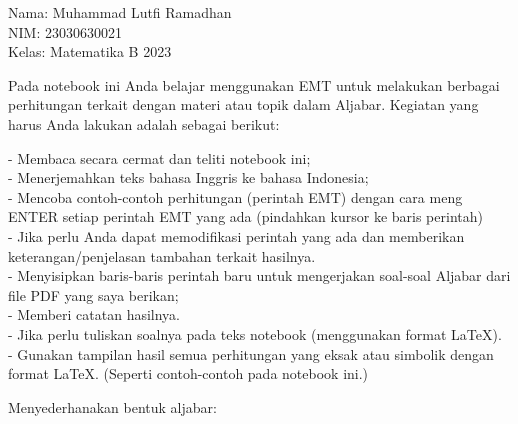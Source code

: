 \documentclass[a4paper,10pt]{article}
\begin{document}
\begin{eulernotebook}
\begin{eulercomment}
Nama: Muhammad Lutfi Ramadhan\\
NIM: 23030630021\\
Kelas: Matematika B 2023

\begin{eulercomment}
\begin{eulercomment}
Pada notebook ini Anda belajar menggunakan EMT untuk melakukan
berbagai perhitungan terkait dengan materi atau topik dalam Aljabar.
Kegiatan yang harus Anda lakukan adalah sebagai berikut:

- Membaca secara cermat dan teliti notebook ini;\\
- Menerjemahkan teks bahasa Inggris ke bahasa Indonesia;\\
- Mencoba contoh-contoh perhitungan (perintah EMT) dengan cara meng
ENTER setiap perintah EMT yang ada (pindahkan kursor ke baris
perintah)\\
- Jika perlu Anda dapat memodifikasi perintah yang ada dan memberikan
keterangan/penjelasan tambahan terkait hasilnya.\\
- Menyisipkan baris-baris perintah baru untuk mengerjakan soal-soal
Aljabar dari file PDF yang saya berikan;\\
- Memberi catatan hasilnya.\\
- Jika perlu tuliskan soalnya pada teks notebook (menggunakan format
LaTeX).\\
- Gunakan tampilan hasil semua perhitungan yang eksak atau simbolik
dengan format LaTeX. (Seperti contoh-contoh pada notebook ini.)

\end{eulercomment}
\begin{eulercomment}
Menyederhanakan bentuk aljabar:


\end{eulercomment}
\end{eulercomment}
\end{eulercomment}
\end{eulernotebook}
\end{document}
